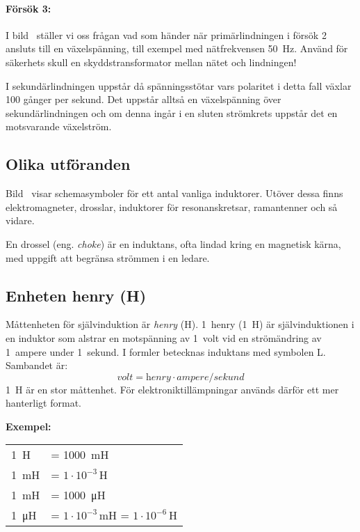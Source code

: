 \paragraph{Försök 3:}
I bild~ ställer vi oss frågan vad som händer när
primärlindningen i försök 2 ansluts till en växelspänning, till exempel
med nätfrekvensen \qty{50}{\hertz}.
Använd för säkerhets skull en skyddstransformator mellan nätet och lindningen!

I sekundärlindningen uppstår då spänningsstötar vars polaritet i detta fall
växlar 100 gånger per sekund.
Det uppstår alltså en växelspänning över sekundärlindningen och om denna ingår i
en sluten strömkrets uppstår det en motsvarande växelström.


\subsection{Olika utföranden}

Bild~ visar schemasymboler för ett antal vanliga induktorer.
Utöver dessa finns elektromagneter, drosslar, induktorer för resonanskretsar,
ramantenner och så vidare.

En drossel (eng. \emph{choke}) är en induktans, ofta lindad kring en 
magnetisk 
kärna, med uppgift att begränsa strömmen i en ledare.


\subsection{Enheten henry (H)}
\label{enheten_henry}

Måttenheten för självinduktion är \emph{henry} (\unit{\henry}).
1~henry (\qty{1}{\henry}) är självinduktionen i en induktor som alstrar en
motspänning av 1~volt vid en strömändring av 1~ampere under 1~sekund.
I formler betecknas induktans med symbolen L.
Sambandet är:
\[\textit{volt} = \textit{henry} \cdot \textit{ampere}/\textit{sekund}\]
\qty{1}{\henry} är en stor måttenhet.
För elektroniktillämpningar används därför ett mer hanterligt format.

\noindent\textbf{Exempel:}

\begin{center}
\begin{tabular}{ll}
\qty{1}{\henry} & = \qty{1000}{\milli\henry} \\
\qty{1}{\milli\henry} & = \(1 \cdot 10^{-3}\)\,H \\
\qty{1}{\milli\henry} & = \qty{1000}{\micro\henry} \\
\qty{1}{\micro\henry} & = \(1 \cdot 10^{-3}\)\,mH = \(1 \cdot 10^{-6}\)\,H
\end{tabular}
\end{center}

